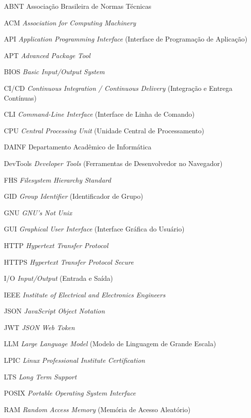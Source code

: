 \begin{siglas}
  \item[ABNT] Associação Brasileira de Normas Técnicas
  \item[ACM] \textit{Association for Computing Machinery}
  \item[API] \textit{Application Programming Interface} (Interface de Programação de Aplicação)
  \item[APT] \textit{Advanced Package Tool}
  \item[BIOS] \textit{Basic Input/Output System}
  \item[CI/CD] \textit{Continuous Integration / Continuous Delivery} (Integração e Entrega Contínuas)
  \item[CLI] \textit{Command-Line Interface} (Interface de Linha de Comando)
  \item[CPU] \textit{Central Processing Unit} (Unidade Central de Processamento)
  \item[DAINF] Departamento Acadêmico de Informática
  \item[DevTools] \textit{Developer Tools} (Ferramentas de Desenvolvedor no Navegador)
  \item[FHS] \textit{Filesystem Hierarchy Standard}
  \item[GID] \textit{Group Identifier} (Identificador de Grupo)
  \item[GNU] \textit{GNU's Not Unix}
  \item[GUI] \textit{Graphical User Interface} (Interface Gráfica do Usuário)
  \item[HTTP] \textit{Hypertext Transfer Protocol}
  \item[HTTPS] \textit{Hypertext Transfer Protocol Secure}
  \item[I/O] \textit{Input/Output} (Entrada e Saída)
  \item[IEEE] \textit{Institute of Electrical and Electronics Engineers}
  \item[JSON] \textit{JavaScript Object Notation}
  \item[JWT] \textit{JSON Web Token}
  \item[LLM] \textit{Large Language Model} (Modelo de Linguagem de Grande Escala)
  \item[LPIC] \textit{Linux Professional Institute Certification}
  \item[LTS] \textit{Long Term Support}
  \item[POSIX] \textit{Portable Operating System Interface}
  \item[RAM] \textit{Random Access Memory} (Memória de Acesso Aleatório)

\end{siglas}
